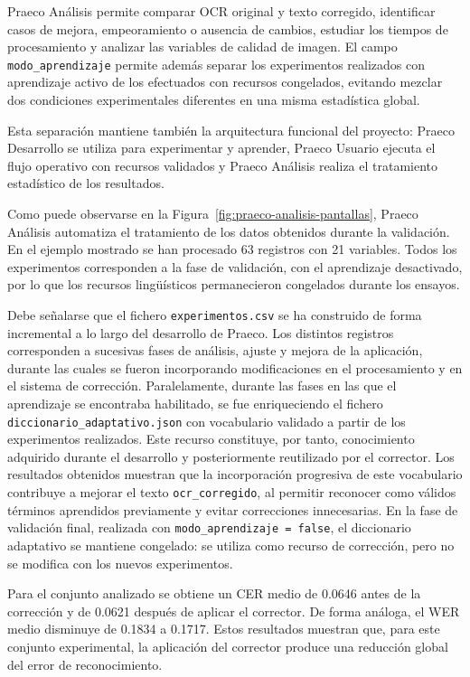 Praeco Análisis permite comparar OCR original y texto corregido, identificar casos de mejora, empeoramiento o ausencia de cambios, estudiar los tiempos de procesamiento y analizar las variables de calidad de imagen. El campo \texttt{modo\_aprendizaje} permite además separar los experimentos realizados con aprendizaje activo de los efectuados con recursos congelados, evitando mezclar dos condiciones experimentales diferentes en una misma estadística global.

Esta separación mantiene también la arquitectura funcional del proyecto: Praeco Desarrollo se utiliza para experimentar y aprender, Praeco Usuario ejecuta el flujo operativo con recursos validados y Praeco Análisis realiza el tratamiento estadístico de los resultados.

Como puede observarse en la Figura~\ref{fig:praeco-analisis-pantallas}, Praeco Análisis automatiza el tratamiento de los datos obtenidos durante la validación. En el ejemplo mostrado se han procesado 63 registros con 21 variables. Todos los experimentos corresponden a la fase de validación, con el aprendizaje desactivado, por lo que los recursos lingüísticos permanecieron congelados durante los ensayos.

\medskip
Debe señalarse que el fichero \texttt{experimentos.csv} se ha construido de forma incremental a lo largo del desarrollo de Praeco. Los distintos registros corresponden a sucesivas fases de análisis, ajuste y mejora de la aplicación, durante las cuales se fueron incorporando modificaciones en el procesamiento y en el sistema de corrección. Paralelamente, durante las fases en las que el aprendizaje se encontraba habilitado, se fue enriqueciendo el fichero \texttt{diccionario\_adaptativo.json} con vocabulario validado a partir de los experimentos realizados. Este recurso constituye, por tanto, conocimiento adquirido durante el desarrollo y posteriormente reutilizado por el corrector. Los resultados obtenidos muestran que la incorporación progresiva de este vocabulario contribuye a mejorar el texto \texttt{ocr\_corregido}, al permitir reconocer como válidos términos aprendidos previamente y evitar correcciones innecesarias. En la fase de validación final, realizada con \texttt{modo\_aprendizaje = false}, el diccionario adaptativo se mantiene congelado: se utiliza como recurso de corrección, pero no se modifica con los nuevos experimentos.

\medskip
Para el conjunto analizado se obtiene un CER medio de 0.0646 antes de la corrección y de 0.0621 después de aplicar el corrector. De forma análoga, el WER medio disminuye de 0.1834 a 0.1717. Estos resultados muestran que, para este conjunto experimental, la aplicación del corrector produce una reducción global del error de reconocimiento.

